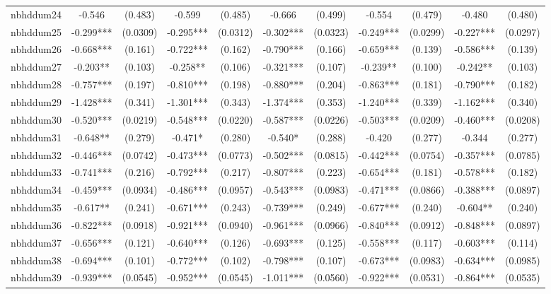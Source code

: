 \documentclass[]{article}
\begin{document}
\begin{tabular}{lcccccccccc}
nbhddum24 & -0.546 & (0.483) & -0.599 & (0.485) & -0.666 & (0.499) & -0.554 & (0.479) & -0.480 & (0.480) \\
nbhddum25 & -0.299*** & (0.0309) & -0.295*** & (0.0312) & -0.302*** & (0.0323) & -0.249*** & (0.0299) & -0.227*** & (0.0297) \\
nbhddum26 & -0.668*** & (0.161) & -0.722*** & (0.162) & -0.790*** & (0.166) & -0.659*** & (0.139) & -0.586*** & (0.139) \\
nbhddum27 & -0.203** & (0.103) & -0.258** & (0.106) & -0.321*** & (0.107) & -0.239** & (0.100) & -0.242** & (0.103) \\
nbhddum28 & -0.757*** & (0.197) & -0.810*** & (0.198) & -0.880*** & (0.204) & -0.863*** & (0.181) & -0.790*** & (0.182) \\
nbhddum29 & -1.428*** & (0.341) & -1.301*** & (0.343) & -1.374*** & (0.353) & -1.240*** & (0.339) & -1.162*** & (0.340) \\
nbhddum30 & -0.520*** & (0.0219) & -0.548*** & (0.0220) & -0.587*** & (0.0226) & -0.503*** & (0.0209) & -0.460*** & (0.0208) \\
nbhddum31 & -0.648** & (0.279) & -0.471* & (0.280) & -0.540* & (0.288) & -0.420 & (0.277) & -0.344 & (0.277) \\
nbhddum32 & -0.446*** & (0.0742) & -0.473*** & (0.0773) & -0.502*** & (0.0815) & -0.442*** & (0.0754) & -0.357*** & (0.0785) \\
nbhddum33 & -0.741*** & (0.216) & -0.792*** & (0.217) & -0.807*** & (0.223) & -0.654*** & (0.181) & -0.578*** & (0.182) \\
nbhddum34 & -0.459*** & (0.0934) & -0.486*** & (0.0957) & -0.543*** & (0.0983) & -0.471*** & (0.0866) & -0.388*** & (0.0897) \\
nbhddum35 & -0.617** & (0.241) & -0.671*** & (0.243) & -0.739*** & (0.249) & -0.677*** & (0.240) & -0.604** & (0.240) \\
nbhddum36 & -0.822*** & (0.0918) & -0.921*** & (0.0940) & -0.961*** & (0.0966) & -0.840*** & (0.0912) & -0.848*** & (0.0897) \\
nbhddum37 & -0.656*** & (0.121) & -0.640*** & (0.126) & -0.693*** & (0.125) & -0.558*** & (0.117) & -0.603*** & (0.114) \\
nbhddum38 & -0.694*** & (0.101) & -0.772*** & (0.102) & -0.798*** & (0.107) & -0.673*** & (0.0983) & -0.634*** & (0.0985) \\
nbhddum39 & -0.939*** & (0.0545) & -0.952*** & (0.0545) & -1.011*** & (0.0560) & -0.922*** & (0.0531) & -0.864*** & (0.0535) \\

\end{tabular}
\end{document}
